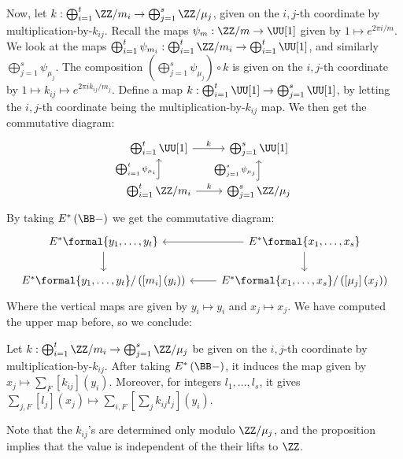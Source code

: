 Now, let $k: \bigoplus_{i=1}^t \ZZ/m_i \to \bigoplus_{j=1}^s \ZZ/\mu_j$, given on the $i,j$-th coordinate by multiplication-by-$k_{ij}$.
Recall the maps $\psi_m: \ZZ/m \to \UU[1]$ given by $1 \mapsto e^{2\pi i/m}$.
We look at the maps $\bigoplus_{i=1}^t \psi_{m_i}: \bigoplus_{i=1}^t \ZZ/m_i \to \bigoplus_{i=1}^t \UU[1]$, and similarly $\bigoplus_{j=1}^s \psi_{\mu_j}$.
The composition $\left(\bigoplus_{j=1}^s \psi_{\mu_j}\right) \circ k$ is given on the $i,j$-th coordinate by
$
1
\mapsto k_{ij}
\mapsto e^{2\pi ik_{ij}/m_j}
$.
Define a map $k: \bigoplus_{i=1}^t \UU[1] \to \bigoplus_{j=1}^s \UU[1]$, by letting the $i,j$-th coordinate being the multiplication-by-$k_{ij}$ map.
We then get the commutative diagram:
$$
\begin{tikzcd}
	\bigoplus_{i=1}^t \UU[1] \arrow{r}{k} & \bigoplus_{j=1}^s \UU[1] \\
	\bigoplus_{i=1}^t \ZZ/m_i \arrow[hook]{u}{\bigoplus_{i=1}^t \psi_{\mu_i}} \arrow{r}{k} & \bigoplus_{j=1}^s \ZZ/\mu_j \arrow[hook]{u}{\bigoplus_{j=1}^s \psi_{\mu_j}}
\end{tikzcd}
$$
By taking $E^*\left(\BB-\right)$ we get the commutative diagram:
$$
\begin{tikzcd}
	E^*\formal{y_1, \dotsc, y_t} \arrow{d}{} & E^*\formal{x_1, \dotsc, x_s} \arrow{d}{} \arrow{l}{} \\
	E^*\formal{y_1, \dotsc, y_t}/\left(\left[m_i\right]\left(y_i\right)\right) & E^*\formal{x_1, \dotsc, x_s}/\left(\left[\mu_j\right]\left(x_j\right)\right) \arrow{l}{}
\end{tikzcd}
$$
Where the vertical maps are given by $y_i \mapsto y_i$ and $x_j \mapsto x_j$.
We have computed the upper map before, so we conclude:

\begin{proposition}\label{E-B-map-cyclic}
	Let $k: \bigoplus_{i=1}^t \ZZ/m_i \to \bigoplus_{j=1}^s \ZZ/\mu_j$ be given on the $i,j$-th coordinate by multiplication-by-$k_{ij}$.
	After taking $E^*\left(\BB-\right)$, it induces the map given by $x_j \mapsto \sum_F\left[k_{ij}\right]\left(y_i\right)$.
	Moreover, for integers $l_1, \dotsc, l_s$, it gives $\sum_{j,F}\left[l_j\right]\left(x_j\right) \mapsto \sum_{i,F}\left[\sum_j k_{ij} l_j\right]\left(y_i\right)$.
\end{proposition}

\begin{remark}
	Note that the $k_{ij}$'s are determined only modulo $\ZZ/\mu_j$, and the proposition implies that the value is independent of the their lifts to $\ZZ$.
\end{remark}



